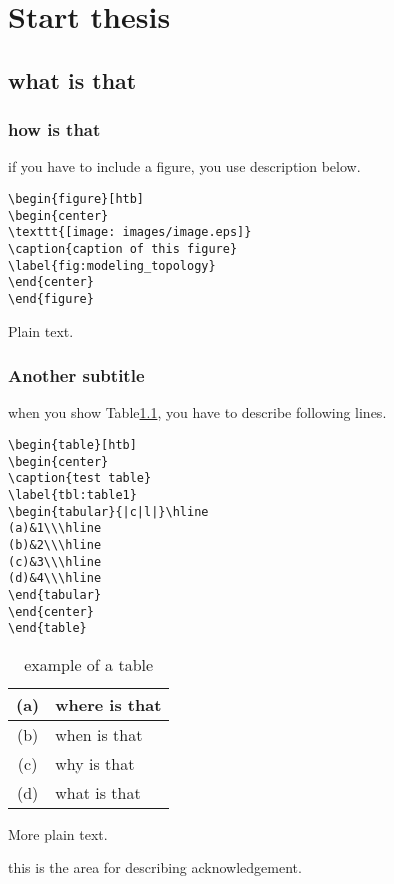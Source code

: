 \documentclass[11pt,a4]{report}
\affiliation{Graduate School of Information Science and Technology, Osaka University}%
\begin{document}
\makepreambles
\chapter{Start thesis}
\section{what is that}


\subsection{how is that}
if you have to include a figure,
you use description below.
\begin{verbatim}
\begin{figure}[htb]
\begin{center}
\texttt{[image: images/image.eps]}
\caption{caption of this figure}
\label{fig:modeling_topology}
\end{center}
\end{figure}
\end{verbatim}
Plain text.


\subsection{Another subtitle}
when you show Table\ref{tbl:table1},
you have to describe following lines.
\begin{verbatim}
\begin{table}[htb]
\begin{center}
\caption{test table}
\label{tbl:table1}
\begin{tabular}{|c|l|}\hline
(a)&1\\\hline
(b)&2\\\hline
(c)&3\\\hline
(d)&4\\\hline
\end{tabular}
\end{center}
\end{table}
\end{verbatim}
\begin{table}[htb]
\begin{center}
\caption{example of a table}
\label{tbl:table1}
\begin{tabular}{|c|l|}\hline
(a)&where is that\cite{ndss_2020}\\\hline
(b)&when is that\\\hline
(c)&why is that\\\hline
(d)&what is that\\\hline
\end{tabular}
\end{center}
\end{table}
More plain text.

\acknowledgement%
this is the area for describing acknowledgement.





\end{document}
